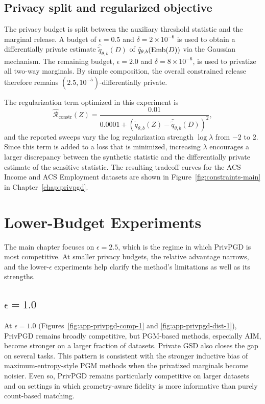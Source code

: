 \subsection{Privacy split and regularized objective}

The privacy budget is split between the auxiliary threshold statistic and the marginal release. A budget of \(\epsilon = 0.5\) and \(\delta = 2 \times 10^{-6}\) is used to obtain a differentially private estimate \(\widehat{\tilde q}_{\theta,b}(D)\) of \(\tilde q_{\theta,b}(\operatorname{Emb}(D))\) via the Gaussian mechanism. The remaining budget, \(\epsilon = 2.0\) and \(\delta = 8 \times 10^{-6}\), is used to privatize all two-way marginals. By simple composition, the overall constrained release therefore remains \((2.5,10^{-5})\)-differentially private.

The regularization term optimized in this experiment is
\[
  \hat{\mathcal{R}}_{\mathrm{constr}}(Z)
  =
  \frac{0.01}{0.0001 + \left(\tilde q_{\theta,b}(Z) - \widehat{\tilde q}_{\theta,b}(D)\right)^2},
\]
and the reported sweeps vary the log regularization strength \(\log\lambda\) from \(-2\) to \(2\). Since this term is added to a loss that is minimized, increasing \(\lambda\) encourages a larger discrepancy between the synthetic statistic and the differentially private estimate of the sensitive statistic. The resulting tradeoff curves for the ACS Income and ACS Employment datasets are shown in Figure~\ref{fig:constraints-main} in Chapter~\ref{chap:privpgd}.

\clearpage
\section{Lower-Budget Experiments}
\label{app:privpgd-low-eps}

The main chapter focuses on \(\epsilon = 2.5\), which is the regime in which PrivPGD is most competitive. At smaller privacy budgets, the relative advantage narrows, and the lower-\(\epsilon\) experiments help clarify the method's limitations as well as its strengths.

\subsection{\texorpdfstring{$\epsilon = 1.0$}{epsilon = 1.0}}

At \(\epsilon = 1.0\) (Figures~\ref{fig:app-privpgd-comp-1} and \ref{fig:app-privpgd-dist-1}), PrivPGD remains broadly competitive, but PGM-based methods, especially AIM, become stronger on a larger fraction of datasets. Private GSD also closes the gap on several tasks. This pattern is consistent with the stronger inductive bias of maximum-entropy-style PGM methods when the privatized marginals become noisier. Even so, PrivPGD remains particularly competitive on larger datasets and on settings in which geometry-aware fidelity is more informative than purely count-based matching.

